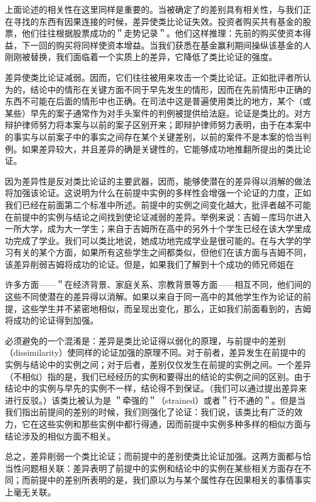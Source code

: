 上面论述的相关性在这里同样是重要的。当被确定了的差别具有相关性，与我们正在寻找的东西有因果连接的时候，差异使类比论证失效。投资者购买共有基金的股票，他们往往根据股票成功的＂走势记录＂。他们这样推理：先前的购买使资本得益，下一回的购买将同样使资本增益。当我们获悉在基金赢利期间操纵该基金的人刚刚被替换，我们面临着一个实质上的差异，它降低了类比论证的强度。

差异使类比论证减弱。因而，它们往往被用来攻击一个类比论证。正如批评者所认为的，结论中的情形在关键方面不同于早先发生的情形，因而在先前情形中正确的东西不可能在后面的情形中也正确。在司法中这是普遍使用类比的地方，某个（或某些）早先的案子通常作为对手头案件的判例被提供给法庭。论证是类比的。对方辩护律师努力将本案与以前的案子区别开来；即辩护律师努力表明，由于在本案中的事实与以前案子中的事实之间存在某个关键差别，以前的案件不是本案的恰当判例。如果差异较大，并且差异的确是关键性的，它能够成功地推翻所提出的类比论证。

因为差异性是反对类比论证的主要武器，因而，能够使潜在的差异得以消解的做法将加强该论证。这说明为什么在前提中实例的多样性会增强一个论证的力度，正如我们已经在前面第二个标准中所述。前提中的实例之间变化越大，批评者越不可能在前提中的实例与结论之间找到使论证减弱的差异。举例来说：吉姆－库玛尔进入一所大学，成为大一学生；来自于吉姆所在高中的另外十个学生已经在该大学里成功完成了学业。我们可以类比地说，她成功地完成学业是很可能的。在与大学的学习有关的某个方面，如果所有这些学生之间都类似，但他们在该方面与吉姆不同，该差异削弱吉姆将成功的论证。但是，如果我们了解到十个成功的师兄师姐在

许多方面——＂在经济背景、家庭关系、宗教背景等方面——相互不同，他们间的这些不同使潜在的差异得以消解。如果以来自于同一高中的其他学生作为论证的前提，这些学生并不紧密地相似，而呈现出变化，那么，正如我们前面看到的，吉姆将成功的论证得到加强。

必须避免的一个混淆是：差异是类比论证得以弱化的原理，与前提中的差别（dissimilarity）使同样的论证加强的原理不同。对于前者，差异发生在前提中的实例与结论中的实例之间；对于后者，差别仅仅发生在前提的实例之间。一个差异（不相似）指的是，我们已经经历的实例和要得出的结论的实例之间的区别。由于结论中的实例与早先的实例不一样，结论得不到保证。（我们可以通过提出差异来进行反驳。）该类比被认为是 ＂牵强的＂（strained）或者＂行不通的＂。但是当我们指出前提间的差别的时候，我们则强化了论证：我们说，该类比有广泛的效力，它在这些实例和那些实例中都行得通，因而前提中实例多种多样的相似方面与结论涉及的相似方面不相关。

总之，差异削弱一个类比论证；而前提中的差别使类比论证加强。这两方面都与恰当性问题相关联：差异表明了前提中的实例和结论中的实例在某些相关方面存在不同；而前提中的差别所表明的是，我们原以为与某个属性存在因果相关的事情事实上毫无关联。

